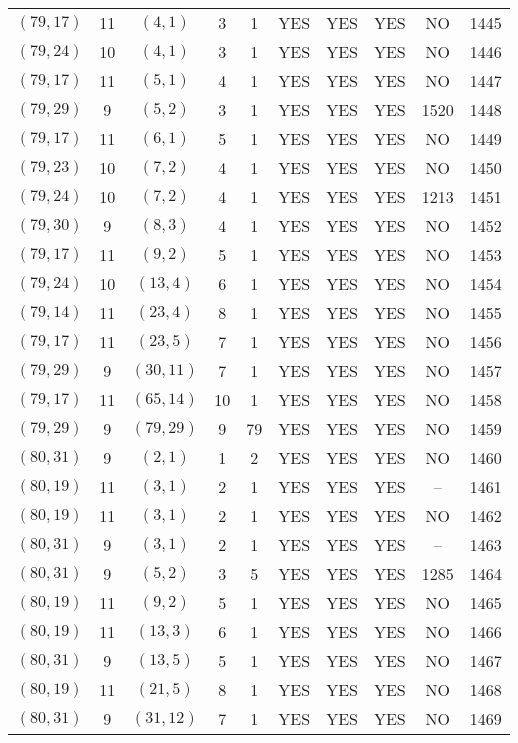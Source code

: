 \begin{longtable}{|c|c|c|c|c|c|c|c|c|c|}
$(79, 17)$ & 11 & $(4, 1)$ & 3 & 1 & YES & YES & YES & NO & 1445\\
$(79, 24)$ & 10 & $(4, 1)$ & 3 & 1 & YES & YES & YES & NO & 1446\\
$(79, 17)$ & 11 & $(5, 1)$ & 4 & 1 & YES & YES & YES & NO & 1447\\
$(79, 29)$ & 9 & $(5, 2)$ & 3 & 1 & YES & YES & YES & 1520 & 1448\\
$(79, 17)$ & 11 & $(6, 1)$ & 5 & 1 & YES & YES & YES & NO & 1449\\
$(79, 23)$ & 10 & $(7, 2)$ & 4 & 1 & YES & YES & YES & NO & 1450\\
$(79, 24)$ & 10 & $(7, 2)$ & 4 & 1 & YES & YES & YES & 1213 & 1451\\
$(79, 30)$ & 9 & $(8, 3)$ & 4 & 1 & YES & YES & YES & NO & 1452\\
$(79, 17)$ & 11 & $(9, 2)$ & 5 & 1 & YES & YES & YES & NO & 1453\\
$(79, 24)$ & 10 & $(13, 4)$ & 6 & 1 & YES & YES & YES & NO & 1454\\
$(79, 14)$ & 11 & $(23, 4)$ & 8 & 1 & YES & YES & YES & NO & 1455\\
$(79, 17)$ & 11 & $(23, 5)$ & 7 & 1 & YES & YES & YES & NO & 1456\\
$(79, 29)$ & 9 & $(30, 11)$ & 7 & 1 & YES & YES & YES & NO & 1457\\
$(79, 17)$ & 11 & $(65, 14)$ & 10 & 1 & YES & YES & YES & NO & 1458\\
$(79, 29)$ & 9 & $(79, 29)$ & 9 & 79 & YES & YES & YES & NO & 1459\\
$(80, 31)$ & 9 & $(2, 1)$ & 1 & 2 & YES & YES & YES & NO & 1460\\
$(80, 19)$ & 11 & $(3, 1)$ & 2 & 1 & YES & YES & YES & -- & 1461\\
$(80, 19)$ & 11 & $(3, 1)$ & 2 & 1 & YES & YES & YES & NO & 1462\\
$(80, 31)$ & 9 & $(3, 1)$ & 2 & 1 & YES & YES & YES & -- & 1463\\
$(80, 31)$ & 9 & $(5, 2)$ & 3 & 5 & YES & YES & YES & 1285 & 1464\\
$(80, 19)$ & 11 & $(9, 2)$ & 5 & 1 & YES & YES & YES & NO & 1465\\
$(80, 19)$ & 11 & $(13, 3)$ & 6 & 1 & YES & YES & YES & NO & 1466\\
$(80, 31)$ & 9 & $(13, 5)$ & 5 & 1 & YES & YES & YES & NO & 1467\\
$(80, 19)$ & 11 & $(21, 5)$ & 8 & 1 & YES & YES & YES & NO & 1468\\
$(80, 31)$ & 9 & $(31, 12)$ & 7 & 1 & YES & YES & YES & NO & 1469\\

\end{longtable}
